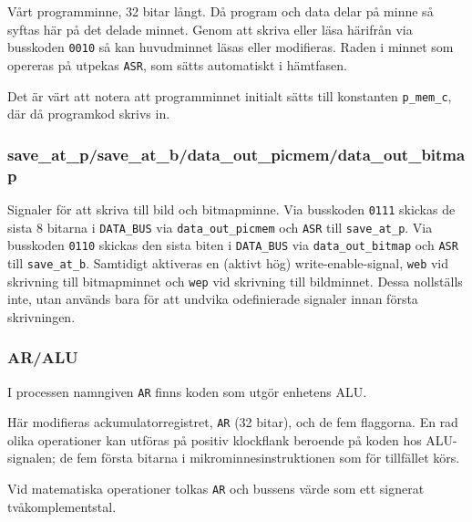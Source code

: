 \documentclass[]{article}
\begin{document}
Vårt programminne, 32 bitar långt. Då program och data delar på minne så syftas här på det delade minnet. Genom att skriva eller läsa härifrån via busskoden \texttt{0010} så kan huvudminnet läsas eller modifieras. Raden i minnet som opereras på utpekas \texttt{ASR}, som sätts automatiskt i hämtfasen.

Det är värt att notera att programminnet initialt sätts till konstanten \texttt{p\_mem\_c}, där då programkod skrivs in.

\subsubsection{save\_at\_p/save\_at\_b/data\_out\_picmem/data\_out\_bitmap}

Signaler för att skriva till bild och bitmapminne. Via busskoden \texttt{0111} skickas de sista 8 bitarna i \texttt{DATA\_BUS} via \texttt{data\_out\_picmem} och \texttt{ASR} till \texttt{save\_at\_p}. Via busskoden \texttt{0110} skickas den sista biten i \texttt{DATA\_BUS} via \texttt{data\_out\_bitmap} och \texttt{ASR} till \texttt{save\_at\_b}. Samtidigt aktiveras en (aktivt hög) write-enable-signal, \texttt{web} vid skrivning till bitmapminnet och \texttt{wep} vid skrivning till bildminnet. Dessa nollställs inte, utan används bara för att undvika odefinierade signaler innan första skrivningen.

\newpage
\subsubsection{AR/ALU}

I processen namngiven \texttt{AR} finns koden som utgör enhetens ALU.

Här modifieras ackumulatorregistret, \texttt{AR} (32 bitar), och de fem flaggorna. En rad olika operationer kan utföras på positiv klockflank beroende på koden hos ALU-signalen; de fem första bitarna i mikrominnesinstruktionen som för tillfället körs.

Vid matematiska operationer tolkas \texttt{AR} och bussens värde som ett signerat tvåkomplementstal.
\end{document}
